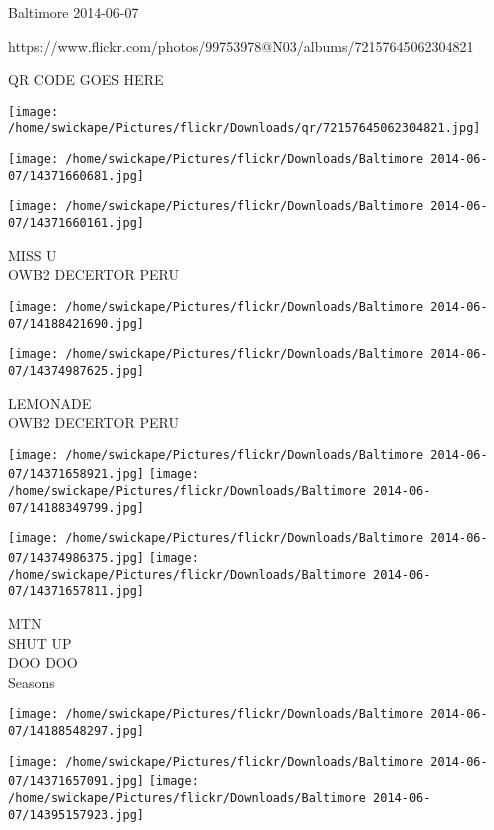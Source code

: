 \documentclass[10pt,letterpaper]{article}
\begin{document}
Baltimore 2014-06-07

https://www.flickr.com/photos/99753978@N03/albums/72157645062304821

QR CODE GOES HERE

\texttt{[image: /home/swickape/Pictures/flickr/Downloads/qr/72157645062304821.jpg]}
\pagebreak

\texttt{[image: /home/swickape/Pictures/flickr/Downloads/Baltimore 2014-06-07/14371660681.jpg]}

\vspace{0.25in}
\texttt{[image: /home/swickape/Pictures/flickr/Downloads/Baltimore 2014-06-07/14371660161.jpg]}

MISS U\\
OWB2 DECERTOR PERU\\
\pagebreak

\texttt{[image: /home/swickape/Pictures/flickr/Downloads/Baltimore 2014-06-07/14188421690.jpg]}

\vspace{0.25in}
\texttt{[image: /home/swickape/Pictures/flickr/Downloads/Baltimore 2014-06-07/14374987625.jpg]}

LEMONADE\\
OWB2 DECERTOR PERU\\
\pagebreak

\texttt{[image: /home/swickape/Pictures/flickr/Downloads/Baltimore 2014-06-07/14371658921.jpg]}
\texttt{[image: /home/swickape/Pictures/flickr/Downloads/Baltimore 2014-06-07/14188349799.jpg]}

\texttt{[image: /home/swickape/Pictures/flickr/Downloads/Baltimore 2014-06-07/14374986375.jpg]}
\texttt{[image: /home/swickape/Pictures/flickr/Downloads/Baltimore 2014-06-07/14371657811.jpg]}

MTN\\
SHUT UP\\
DOO DOO\\
Seasons\\
\pagebreak

\texttt{[image: /home/swickape/Pictures/flickr/Downloads/Baltimore 2014-06-07/14188548297.jpg]}

\vspace{0.25in}
\texttt{[image: /home/swickape/Pictures/flickr/Downloads/Baltimore 2014-06-07/14371657091.jpg]}
\texttt{[image: /home/swickape/Pictures/flickr/Downloads/Baltimore 2014-06-07/14395157923.jpg]}
\end{document}
